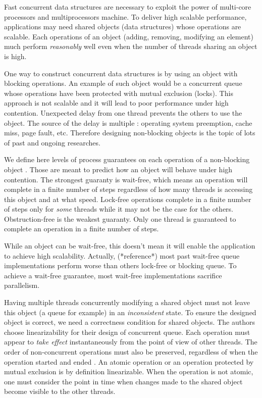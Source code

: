 Fast concurrent data structures are necessary to exploit the power of multi-core
processors and multiprocessors machine. To deliver high scalable performance,
applications may need shared objects (data structures) whose operations are
scalable. Each operations of an object (adding, removing, modifying an element)
much perform \textit{reasonably} well even when the number of threads sharing an
object is high.

One way to construct concurrent data structures is by using an object with
blocking operations. An example of such object would be a concurrent queue whose
operations have been protected with mutual exclusion (locks). This approach is
not scalable and it will lead to poor performance under high contention.
Unexpected delay from one thread prevents the others to use the object. The
source of the delay is multiple : operating system preemption, cache miss, page
fault, etc. Therefore designing non-blocking objects is the topic of lots of
past and ongoing researches.

We define here levels of process guarantees on each operation of a non-blocking
object \cite{Yang:2016:WQF:3016078.2851168}. Those are meant to predict how an
object will behave under high contention. The strongest guaranty is wait-free,
which means an operation will complete in a finite number of steps regardless of
how many threads is accessing this object and at what speed. Lock-free
operations complete in a finite number of steps only for \textit{some} threads
while it may not be the case for the others. Obstruction-free is the weakest
guaranty. Only one thread is guaranteed to complete an operation in a finite
number of steps.

While an object can be wait-free, this doesn't mean it will enable the
application to achieve high scalability. Actually, (*reference*) most past
wait-free queue implementations perform worse than others lock-free or blocking
queue. To achieve a wait-free guarantee, most wait-free implementations
sacrifice parallelism.

Having multiple threads concurrently modifying a shared object must not leave
this object (a queue for example) in an \textit{inconsistent} state. To ensure
the designed object is correct, we need a correctness condition for shared
objects. The authors choose linearizability for their design of concurrent queue.
Each operation must appear to \textit{take effect} instantaneously from the
point of view of other threads. The order of non-concurrent operations must also
be preserved, regardless of when the operation started and ended
\cite{Herlihy:1990:LCC:78969.78972}. An atomic operation or an operation
protected by mutual exclusion is by definition linearizable. When the operation
is not atomic, one must consider the point in time when changes made to the
shared object become visible to the other threads.

